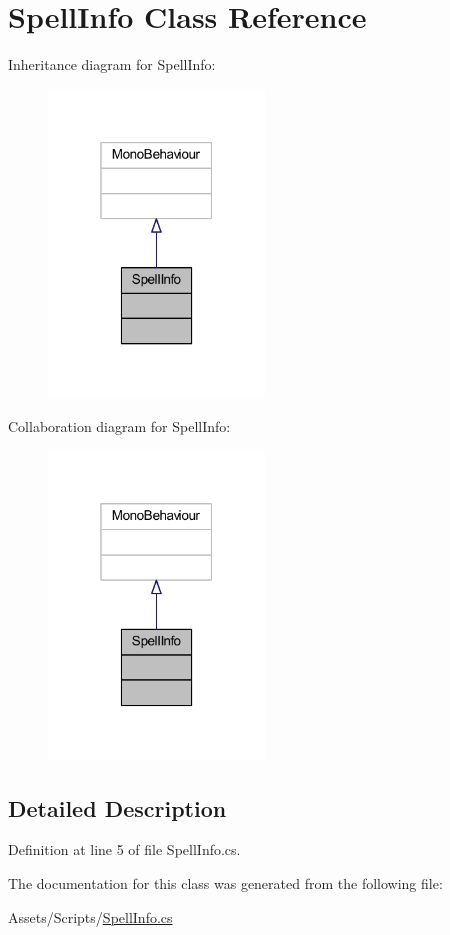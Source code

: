 \hypertarget{class_spell_info}{}\section{Spell\+Info Class Reference}
\label{class_spell_info}


Inheritance diagram for Spell\+Info\+:
\nopagebreak
\begin{figure}[H]
\begin{center}
\leavevmode
\includegraphics[width=163pt]{class_spell_info__inherit__graph}
\end{center}
\end{figure}


Collaboration diagram for Spell\+Info\+:
\nopagebreak
\begin{figure}[H]
\begin{center}
\leavevmode
\includegraphics[width=163pt]{class_spell_info__coll__graph}
\end{center}
\end{figure}


\subsection{Detailed Description}


Definition at line 5 of file Spell\+Info.\+cs.



The documentation for this class was generated from the following file\+:\begin{DoxyCompactItemize}
\item 
Assets/\+Scripts/\mbox{\hyperlink{_spell_info_8cs}{Spell\+Info.\+cs}}\end{DoxyCompactItemize}

